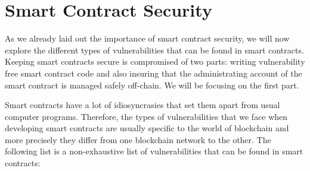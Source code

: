 \section{Smart Contract Security} \label{section:smart_contract_security}
As we already laid out the importance of smart contract security, we will now explore the different types of vulnerabilities that can be found in smart contracts. Keeping smart contracts secure is compromised of two parts: writing vulnerability free smart contract code and also insuring that the administrating account of the smart contract is managed safely off-chain. We will be focusing on the first part.

Smart contracts have a lot of idiosyncrasies that set them apart from usual computer programs. Therefore, the types of vulnerabilities that we face when developing smart contracts are usually specific to the world of blockchain and more precisely they differ from one blockchain network to the other. The following list is a non-exhaustive list of vulnerabilities that can be found in smart contracts:
